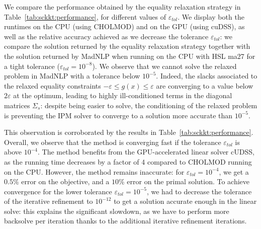 We compare the performance obtained by the equality relaxation strategy
in Table~\ref{tab:sckkt:performance}, for different values of $\varepsilon_{tol}$.
We display both the runtimes on the CPU (using CHOLMOD) and on the GPU
(using cuDSS), as well as the relative accuracy achieved as we decrease the tolerance
$\varepsilon_{tol}$: we compare the solution
returned by the equality relaxation strategy together
with the solution returned by MadNLP when running on the CPU
with HSL ma27 for a tight tolerance ($\varepsilon_{tol} = 10^{-8}$).
We observe that we cannot solve the relaxed problem in MadNLP
with a tolerance below $10^{-5}$. Indeed, the slacks associated
to the relaxed equality constraints $-\varepsilon \leq g(x) \leq \varepsilon$
are converging to a value below $2 \varepsilon$ at the optimum,
leading to highly ill-conditioned terms in the diagonal matrices
$\Sigma_s$: despite being easier to solve, the conditioning
of the relaxed problem is preventing the IPM solver to converge
to a solution more accurate than $10^{-5}$.

This observation is corroborated by the results in Table~\ref{tab:sckkt:performance}.
Overall, we observe that the method is converging fast
if the tolerance $\varepsilon_{tol}$ is above $10^{-4}$.
The method benefits from the GPU-accelerated linear solver cUDSS, as
the running time decreases by a factor of 4 compared to CHOLMOD
running on the CPU. However, the method remains inaccurate:
for $\varepsilon_{tol} = 10^{-4}$, we get a $0.5$\% error on the objective,
and a $10$\% error on the primal solution.
To achieve convergence for the lower tolerance $\varepsilon_{tol} = 10^{-5}$,
we had to decrease the tolerance of the iterative refinement
to $10^{-12}$ to get a solution accurate enough in the linear solve:
this explains the significant slowdown, as we have to perform more
backsolve per iteration thanks to the additional iterative refinement
iterations.

